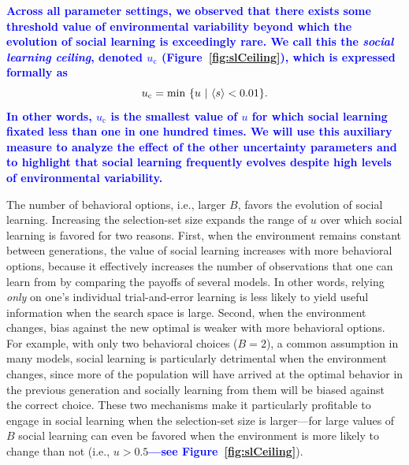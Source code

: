 \documentclass[letterpaper,11.5pt]{scrartcl}
\newcommand{\edit}[1]{{\bfseries \textcolor{blue} {#1}}}
\begin{document}
\edit{Across all parameter settings, we observed that there exists some threshold value of environmental
  variability beyond which the evolution of social learning is exceedingly rare.  We call this the
  \emph{social learning ceiling}, denoted $u_\text{c}$ (Figure~\ref{fig:slCeiling}), which is expressed formally as 
\begin{equation}
  u_\text{c} = \min~\{ u~|~\langle s \rangle < 0.01 \}.
  \label{eq:slCeiling}
\end{equation}
\noindent
In other words, $u_\text{c}$ is the smallest value of $u$ for which social learning fixated
less than one in one hundred times. We will use this auxiliary measure to analyze the effect of
the other uncertainty parameters and to highlight that social learning frequently 
evolves despite high levels of environmental variability.}

The number of behavioral options, i.e., larger $B$, favors the evolution of social learning. Increasing the selection-set size
expands the range of $u$ over which social learning is favored for two reasons. First, when the environment remains constant between
generations, the value of social learning increases with more behavioral options, because it effectively increases the number of
observations that one can learn from by comparing the payoffs of several models. In other words, relying \emph{only} on one's
individual trial-and-error learning is less likely to yield useful information when the search space is
large. Second, when the environment changes, bias against the new optimal is weaker with more behavioral
options. For example, with only two behavioral choices ($B = 2$), a common assumption in many models, social
learning is particularly detrimental when the environment changes, since more of the population will have
arrived at the optimal behavior in the previous generation and socially learning from them will be biased
against the correct choice. These two mechanisms make it particularly profitable to engage in social
learning when the selection-set size is larger---for large values of $B$ social learning can even be favored
when the environment is more likely to change than not (i.e.,
$u>0.5$\edit{---see Figure~\ref{fig:slCeiling}}). 
\end{document}
